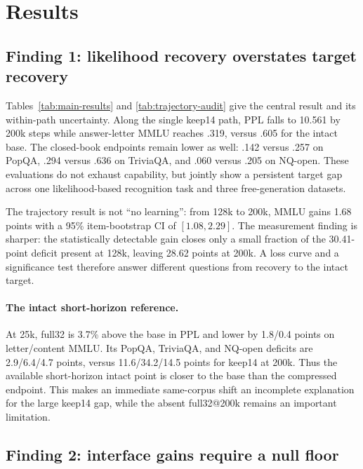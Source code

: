 \section{Results}
\label{sec:experiments}

\subsection{Finding 1: likelihood recovery overstates target recovery}




Tables~\ref{tab:main-results} and \ref{tab:trajectory-audit} give the central
result and its within-path uncertainty.
Along the single keep14 path, PPL falls to 10.561 by 200k steps while
answer-letter MMLU reaches .319, versus .605 for the intact base. The
closed-book endpoints remain lower as well: .142 versus .257 on PopQA, .294
versus .636 on TriviaQA, and .060 versus .205 on NQ-open. These evaluations do
not exhaust capability, but jointly show a persistent target gap across one
likelihood-based recognition task and three free-generation datasets.

The trajectory result is not ``no learning'': from 128k to 200k, MMLU gains
1.68 points with a 95\% item-bootstrap CI of $[1.08,2.29]$. The measurement
finding is sharper: the statistically detectable gain closes only a small
fraction of the 30.41-point deficit present at 128k, leaving 28.62 points at
200k. A loss curve and a significance test therefore answer different
questions from recovery to the intact target.

\paragraph{The intact short-horizon reference.}
At 25k, full32 is 3.7\% above the base in PPL and lower by 1.8/0.4 points on
letter/content MMLU. Its PopQA, TriviaQA, and NQ-open deficits are
2.9/6.4/4.7 points, versus 11.6/34.2/14.5 points for keep14 at 200k. Thus the
available short-horizon intact point is closer to the base than the compressed
endpoint. This makes an immediate same-corpus shift an incomplete explanation
for the large keep14 gap, while the absent full32@200k remains an important
limitation.

\subsection{Finding 2: interface gains require a null floor}


